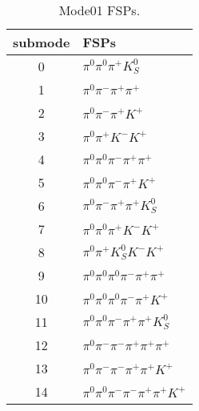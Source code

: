 \begin{table}[h!]
\begin{center}
\begin{tabular}{cl}
\hline
submode& FSPs\\
\hline
0 & $\pi^0 \pi^0 \pi^+ K_S^0 $ \\
1 & $\pi^0 \pi^- \pi^+ \pi^+ $ \\
2 & $\pi^0 \pi^- \pi^+ K^+ $ \\
3 & $\pi^0 \pi^+ K^- K^+ $ \\
4 & $\pi^0 \pi^0 \pi^- \pi^+ \pi^+ $ \\
5 & $\pi^0 \pi^0 \pi^- \pi^+ K^+ $ \\
6 & $\pi^0 \pi^- \pi^+ \pi^+ K_S^0 $ \\
7 & $\pi^0 \pi^0 \pi^+ K^- K^+ $ \\
8 & $\pi^0 \pi^+ K_S^0 K^- K^+ $ \\
9 & $\pi^0 \pi^0 \pi^0 \pi^- \pi^+ \pi^+ $ \\
10 & $\pi^0 \pi^0 \pi^0 \pi^- \pi^+ K^+ $ \\
11 & $\pi^0 \pi^0 \pi^- \pi^+ \pi^+ K_S^0 $ \\
12 & $\pi^0 \pi^- \pi^- \pi^+ \pi^+ \pi^+ $ \\
13 & $\pi^0 \pi^- \pi^- \pi^+ \pi^+ K^+ $ \\
14 & $\pi^0 \pi^0 \pi^- \pi^- \pi^+ \pi^+ K^+ $ \\
\hline
\end{tabular}
\label{tab:Mode01FSPs}
\caption{Mode01 FSPs.}
\end{center}
\end{table}
